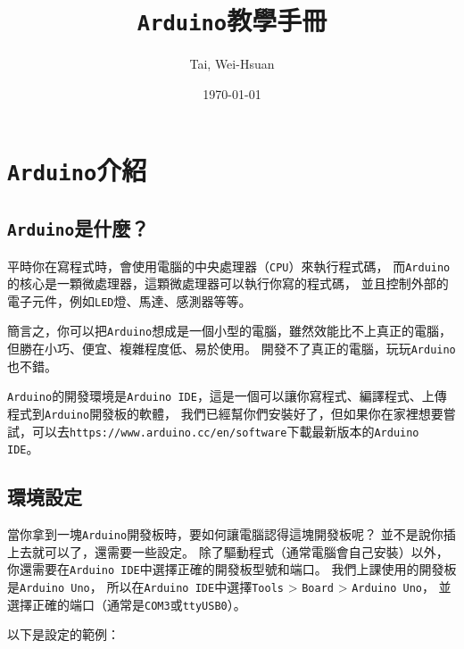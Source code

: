 \documentclass[12pt,a4paper]{article}
\title{\texttt{Arduino}教學手冊}
\author{Tai, Wei-Hsuan}
\date{\today}
\begin{document}
\maketitle

\newpage
\tableofcontents
\newpage

\newpage
\section{\texttt{Arduino}介紹}

\subsection{\texttt{Arduino}是什麼？}
平時你在寫程式時，會使用電腦的中央處理器（\texttt{CPU}）來執行程式碼，
而\texttt{Arduino}的核心是一顆微處理器，這顆微處理器可以執行你寫的程式碼，
並且控制外部的電子元件，例如\texttt{LED}燈、馬達、感測器等等。

簡言之，你可以把\texttt{Arduino}想成是一個小型的電腦，雖然效能比不上真正的電腦，但勝在小巧、便宜、複雜程度低、易於使用。
開發不了真正的電腦，玩玩\texttt{Arduino}也不錯。

\texttt{Arduino}的開發環境是\texttt{Arduino IDE}，這是一個可以讓你寫程式、編譯程式、上傳程式到\texttt{Arduino}開發板的軟體，
我們已經幫你們安裝好了，但如果你在家裡想要嘗試，可以去\texttt{https://www.arduino.cc/en/software}下載最新版本的\texttt{Arduino IDE}。

\subsection{環境設定}

當你拿到一塊\texttt{Arduino}開發板時，要如何讓電腦認得這塊開發板呢？
並不是說你插上去就可以了，還需要一些設定。
除了驅動程式（通常電腦會自己安裝）以外，你還需要在\texttt{Arduino IDE}中選擇正確的開發板型號和端口。
我們上課使用的開發板是\texttt{Arduino Uno}，
所以在\texttt{Arduino IDE}中選擇\texttt{Tools} > \texttt{Board} > \texttt{Arduino Uno}，
並選擇正確的端口（通常是\texttt{COM3}或\texttt{ttyUSB0}）。

以下是設定的範例：
\end{document}
